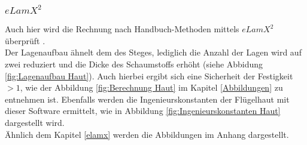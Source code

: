\subsubsection{$eLamX^{2}$}

Auch hier wird die Rechnung nach Handbuch-Methoden mittels $eLamX^{2}$ überprüft \cite{item22}\cite{item3}. \\

\noindent Der Lagenaufbau ähnelt dem des Steges, lediglich die Anzahl der Lagen wird auf zwei reduziert und die Dicke des Schaumstoffs erhöht (siehe Abbidung \ref{fig:Lagenaufbau Haut}). Auch hierbei ergibt sich eine Sicherheit der Festigkeit $>1$, wie der Abbildung \ref{fig:Berechnung Haut} im  Kapitel \ref{Abbildungen} zu entnehmen ist. Ebenfalls werden die Ingenieurskonstanten der Flügelhaut mit dieser Software ermittelt, wie in Abbildung \ref{fig:Ingenieurskonstanten Haut} dargestellt wird.\\

\noindent Ähnlich dem Kapitel \ref{elamx} werden die Abbildungen im Anhang dargestellt.
